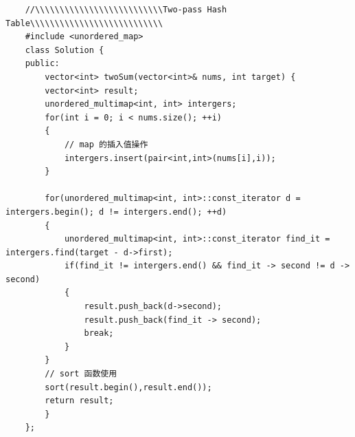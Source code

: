 \documentclass[UTF8,a4paper,12pt]{ctexbook}
\begin{document}
	\begin{lstlisting}
	//\\\\\\\\\\\\\\\\\\\\\\\\\\Two-pass Hash Table\\\\\\\\\\\\\\\\\\\\\\\\\\\
	#include <unordered_map>
	class Solution {
	public:
		vector<int> twoSum(vector<int>& nums, int target) {
		vector<int> result;
		unordered_multimap<int, int> intergers;
		for(int i = 0; i < nums.size(); ++i)
		{
			// map 的插入值操作
			intergers.insert(pair<int,int>(nums[i],i));
		}
		
		for(unordered_multimap<int, int>::const_iterator d = intergers.begin(); d != intergers.end(); ++d)
		{
			unordered_multimap<int, int>::const_iterator find_it = intergers.find(target - d->first);
			if(find_it != intergers.end() && find_it -> second != d -> second)
			{
				result.push_back(d->second);
				result.push_back(find_it -> second);
				break;
			}
		}
		// sort 函数使用
		sort(result.begin(),result.end());
		return result;
		}		
	};
	

\end{lstlisting}
\end{document}
